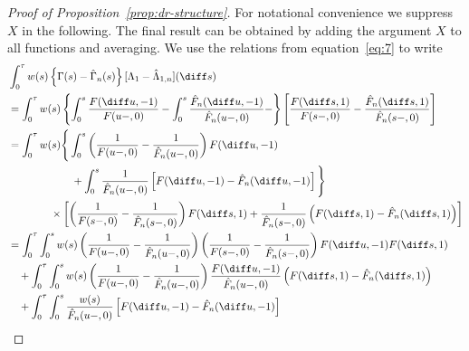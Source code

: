 \begin{proof}[Proof of Proposition~\ref{prop:dr-structure}]
  For notational convenience we suppress \( X \) in the following. The final
  result can be obtained by adding the argument \( X \) to all functions and
  averaging. We use the relations from equation~\eqref{eq:7} to write
  \begingroup %
  \allowdisplaybreaks
    \begin{align*}
      & \int_0^{\tau} w(s) 
        \left\{
        \Gamma(s) - \hat{\Gamma}_n(s)
        \right\}
        [\Lambda_1 - \hat{\Lambda}_{1,n}](\diff s)
      \\
      & =
        \int_0^{\tau} w(s) 
        \left\{
        \int_0^s \frac{F(\diff u, -1)}{F(u-, 0)} -
        \int_0^s \frac{\hat{F}_n(\diff u, -1)}{\hat{F}_n(u-, 0)}  -
        \right\}
        \left[
        \frac{F(\diff s, 1)}{F(s-, 0)}
        - \frac{\hat{F}_n(\diff s, 1)}{\hat{F}_n(s-, 0)}
        \right]
      \\
      & =
        \int_0^{\tau} w(s) 
        \Bigg\{
        \int_0^s 
        \left(
        \frac{1}{F(u-, 0)} -  \frac{1}{\hat{F}_n(u-, 0)}
        \right) F(\diff u, -1)
      \\
      & \qquad\qquad \qquad
        +
        \int_0^s \frac{1}{\hat{F}_n(u-, 0)} 
        \left[
        F(\diff u, -1) - \hat{F}_n(\diff u, -1)
        \right]
        \Bigg\}
      \\
      & \qquad\qquad \times
        \left[
        \left(
        \frac{1}{F(s-, 0)} -
        \frac{1}{\hat{F}_n(s-, 0)}
        \right)F(\diff s, 1)
        + \frac{1}{\hat{F}_n(s-, 0)}
        \left(
        F(\diff s, 1) -
        \hat{F}_n(\diff s, 1)
        \right)
        \right]
      \\
      &
        = \int_0^{\tau} 
        \int_0^s
        w(s) 
        \left(
        \frac{1}{F(u-, 0)} -  \frac{1}{\hat{F}_n(u-, 0)}
        \right) 
        \left(
        \frac{1}{F(s-, 0)} -
        \frac{1}{\hat{F}_n(s-, 0)}
        \right)F(\diff u, -1)F(\diff s, 1)
      \\
      & \quad +
        \int_0^{\tau}
        \int_0^s
        w(s) 
        \left(
        \frac{1}{F(u-, 0)} -  \frac{1}{\hat{F}_n(u-, 0)}
        \right) \frac{F(\diff u, -1) }{\hat{F}_n(u-,0)}
        \left(
        F(\diff s, 1) -
        \hat{F}_n(\diff s, 1)
        \right)
      \\
      & \quad +
        \int_0^{\tau} 
        \int_0^s      
        \frac{w(s) }{\hat{F}_n(u-, 0)} 
        \left[
        F(\diff u, -1) - \hat{F}_n(\diff u, -1)
        \right]

\end{align*}
\end{proof}
